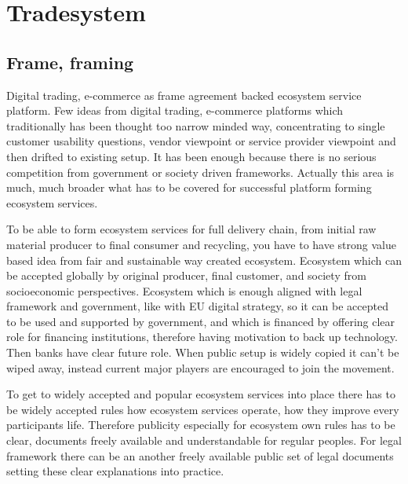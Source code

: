 %
%
%

\part{Tradesystem}
\label{tradesystem}
\chapter{Frame, framing}
\label{frame_framing}

Digital trading, e-commerce as frame agreement backed ecosystem service
platform. Few ideas from digital trading, e-com\-mer\-ce platforms which
traditionally has been thought too narrow mind\-ed way, concentrating to
single customer usability questions, vendor viewpoint or service provider
viewpoint and then drifted to existing setup. It has been enough because there
is no serious competition from government or society driven frameworks.
Actually this area is much, much broader what has to be covered for successful
platform forming ecosystem services.

To be able to form ecosystem services for full delivery chain, from initial
raw material producer to final consumer and recycling, you have to have strong
value based idea from fair and sustainable way created ecosystem. Ecosystem
which can be accepted globally by original producer, final customer, and
society from socioeconomic perspectives. Ecosystem which is enough aligned
with legal framework and government, like with EU digital strategy, so it can
be accepted to be used and supported by government, and which is financed by
offering clear role for financing institutions, therefore having motivation to
back up technology. Then banks have clear future role. When public setup is
widely copied it can't be wiped away, instead current major players are
encouraged to join the movement.

To get to widely accepted and popular ecosystem services into place there has
to be widely accepted rules how ecosystem services operate, how they improve
every participants life. Therefore publicity especially for ecosystem own
rules has to be clear, documents freely available and understandable for
regular peoples. For legal framework there can be an another freely available
public set of legal documents setting these clear explanations into practice.

